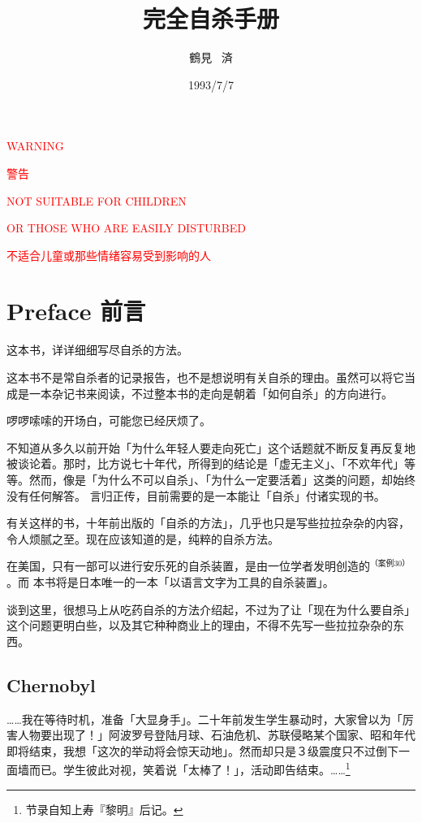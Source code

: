\documentclass[UTF8]{ctexart}
\title{完全自杀手册}
\author{鶴見 \ 済}
\date{1993/7/7}
\begin{document}
\centerline{\large{\textcolor{red}{WARNING}}}
\centerline{\large{\textcolor{red}{警告}}}

\centerline{\textcolor{red}{NOT SUITABLE FOR CHILDREN }}
\centerline{\textcolor{red}{OR THOSE WHO ARE EASILY DISTURBED}}
\centerline{\textcolor{red}{不适合儿童或那些情绪容易受到影响的人}}


\newpage

\maketitle

\newpage
\tableofcontents
\newpage

\section{Preface 前言}

这本书，详详细细写尽自杀的方法。

这本书不是常自杀者的记录报告，也不是想说明有关自杀的理由。虽然可以将它当成是一本杂记书来阅读，不过整本书的走向是朝着「如何自杀」的方向进行。

啰啰嗦嗦的开场白，可能您已经厌烦了。

不知道从多久以前开始「为什么年轻人要走向死亡」这个话题就不断反复再反复地被谈论着。那时，比方说七十年代，所得到的结论是「虚无主义」、「不欢年代」等等。然而，像是「为什么不可以自杀」、「为什么一定要活着」这类的问题，却始终没有任何解答。 言归正传，目前需要的是一本能让「自杀」付诸实现的书。

有关这样的书，十年前出版的「自杀的方法」，几乎也只是写些拉拉杂杂的内容，令人烦腻之至。现在应该知道的是，纯粹的自杀方法。

在美国，只有一部可以进行安乐死的自杀装置，是由一位学者发明创造的$^{（案例 30）}$。而 本书将是日本唯一的一本「以语言文字为工具的自杀装置」。

谈到这里，很想马上从吃药自杀的方法介绍起，不过为了让「现在为什么要自杀」这个问题更明白些，以及其它种种商业上的理由，不得不先写一些拉拉杂杂的东西。

\subsection{Chernobyl}

……我在等待时机，准备「大显身手」。二十年前发生学生暴动时，大家曾以为「厉害人物要出现了！」阿波罗号登陆月球、石油危机、苏联侵略某个国家、昭和年代即将结束，我想「这次的举动将会惊天动地」。然而却只是３级震度只不过倒下一面墙而已。学生彼此对视，笑着说「太棒了！」，活动即告结束。……\footnote{节录自知上寿『黎明』后记。}
\end{document}
